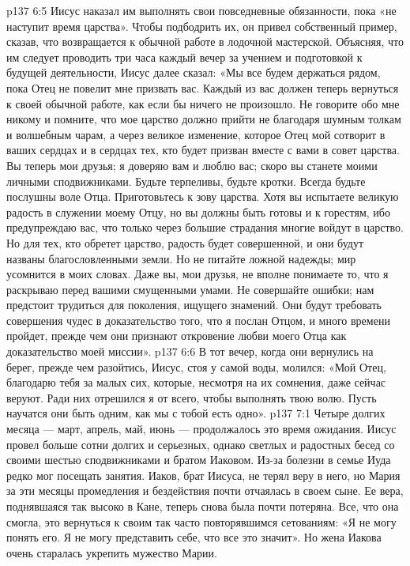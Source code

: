 \vs p137 6:5 Иисус наказал им выполнять свои повседневные обязанности, пока «не наступит время царства». Чтобы подбодрить их, он привел собственный пример, сказав, что возвращается к обычной работе в лодочной мастерской. Объясняя, что им следует проводить три часа каждый вечер за учением и подготовкой к будущей деятельности, Иисус далее сказал: «Мы все будем держаться рядом, пока Отец не повелит мне призвать вас. Каждый из вас должен теперь вернуться к своей обычной работе, как если бы ничего не произошло. Не говорите обо мне никому и помните, что мое царство должно прийти не благодаря шумным толкам и волшебным чарам, а через великое изменение, которое Отец мой сотворит в ваших сердцах и в сердцах тех, кто будет призван вместе с вами в совет царства. Вы теперь мои друзья; я доверяю вам и люблю вас; скоро вы станете моими личными сподвижниками. Будьте терпеливы, будьте кротки. Всегда будьте послушны воле Отца. Приготовьтесь к зову царства. Хотя вы испытаете великую радость в служении моему Отцу, но вы должны быть готовы и к горестям, ибо предупреждаю вас, что только через большие страдания многие войдут в царство. Но для тех, кто обретет царство, радость будет совершенной, и они будут названы благословленными земли. Но не питайте ложной надежды; мир усомнится в моих словах. Даже вы, мои друзья, не вполне понимаете то, что я раскрываю перед вашими смущенными умами. Не совершайте ошибки; нам предстоит трудиться для поколения, ищущего знамений. Они будут требовать совершения чудес в доказательство того, что я послан Отцом, и много времени пройдет, прежде чем они признают откровение любви моего Отца как доказательство моей миссии».
\vs p137 6:6 В тот вечер, когда они вернулись на берег, прежде чем разойтись, Иисус, стоя у самой воды, молился: «Мой Отец, благодарю тебя за малых сих, которые, несмотря на их сомнения, даже сейчас веруют. Ради них отрешился я от всего, чтобы выполнять твою волю. Пусть научатся они быть одним, как мы с тобой есть одно».
\vs p137 7:1 Четыре долгих месяца --- март, апрель, май, июнь --- продолжалось это время ожидания. Иисус провел больше сотни долгих и серьезных, однако светлых и радостных бесед со своими шестью сподвижниками и братом Иаковом. Из\hyp{}за болезни в семье Иуда редко мог посещать занятия. Иаков, брат Иисуса, не терял веру в него, но Мария за эти месяцы промедления и бездействия почти отчаялась в своем сыне. Ее вера, поднявшаяся так высоко в Кане, теперь снова была почти потеряна. Все, что она смогла, это вернуться к своим так часто повторявшимся сетованиям: «Я не могу понять его. Я не могу представить себе, что все это значит». Но жена Иакова очень старалась укрепить мужество Марии.
